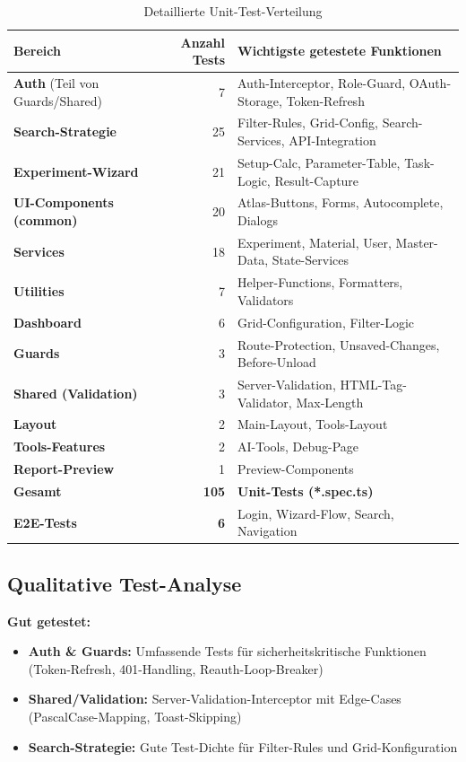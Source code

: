 \begin{table}[H]
\centering
\caption{Detaillierte Unit-Test-Verteilung}
\label{tab:unit-test-details}
\renewcommand{\arraystretch}{1.2}
\small
\begin{tabular}{@{}lrl@{}}
\toprule
\textbf{Bereich} & \textbf{Anzahl Tests} & \textbf{Wichtigste getestete Funktionen} \\
\midrule
\textbf{Auth} (Teil von Guards/Shared) & 7 & Auth-Interceptor, Role-Guard, OAuth-Storage, Token-Refresh \\
\textbf{Search-Strategie} & 25 & Filter-Rules, Grid-Config, Search-Services, API-Integration \\
\textbf{Experiment-Wizard} & 21 & Setup-Calc, Parameter-Table, Task-Logic, Result-Capture \\
\textbf{UI-Components (common)} & 20 & Atlas-Buttons, Forms, Autocomplete, Dialogs \\
\textbf{Services} & 18 & Experiment, Material, User, Master-Data, State-Services \\
\textbf{Utilities} & 7 & Helper-Functions, Formatters, Validators \\
\textbf{Dashboard} & 6 & Grid-Configuration, Filter-Logic \\
\textbf{Guards} & 3 & Route-Protection, Unsaved-Changes, Before-Unload \\
\textbf{Shared (Validation)} & 3 & Server-Validation, HTML-Tag-Validator, Max-Length \\
\textbf{Layout} & 2 & Main-Layout, Tools-Layout \\
\textbf{Tools-Features} & 2 & AI-Tools, Debug-Page \\
\textbf{Report-Preview} & 1 & Preview-Components \\
\midrule
\textbf{Gesamt} & \textbf{105} & \textbf{Unit-Tests (*.spec.ts)} \\
\addlinespace
\textbf{E2E-Tests} & \textbf{6} & Login, Wizard-Flow, Search, Navigation \\
\bottomrule
\end{tabular}
\end{table}

\vspace{0.5cm}

\subsection*{Qualitative Test-Analyse}

\textbf{Gut getestet:}
\begin{itemize}[noitemsep]
	\item \textbf{Auth \& Guards:} Umfassende Tests für sicherheitskritische Funktionen (Token-Refresh, 401-Handling, Reauth-Loop-Breaker)
	\item \textbf{Shared/Validation:} Server-Validation-Interceptor mit Edge-Cases (PascalCase-Mapping, Toast-Skipping)
	\item \textbf{Search-Strategie:} Gute Test-Dichte für Filter-Rules und Grid-Konfiguration
\end{itemize}

